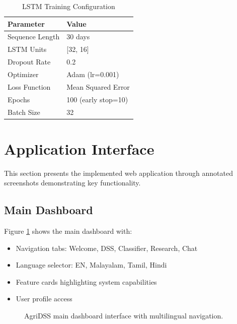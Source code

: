 \documentclass[journal,10pt,twoside]{IEEEtran}
\begin{document}
\begin{table}[h]
\centering
\caption{LSTM Training Configuration}
\begin{tabular}{|l|l|}
\hline
\textbf{Parameter} & \textbf{Value} \\
\hline
Sequence Length & 30 days \\
LSTM Units & [32, 16] \\
Dropout Rate & 0.2 \\
Optimizer & Adam (lr=0.001) \\
Loss Function & Mean Squared Error \\
Epochs & 100 (early stop=10) \\
Batch Size & 32 \\
\hline
\end{tabular}
\end{table}

\section{Application Interface}

This section presents the implemented web application through annotated screenshots demonstrating key functionality.

\subsection{Main Dashboard}

Figure \ref{fig:app_dashboard} shows the main dashboard with:
\begin{itemize}
    \item Navigation tabs: Welcome, DSS, Classifier, Research, Chat
    \item Language selector: EN, Malayalam, Tamil, Hindi
    \item Feature cards highlighting system capabilities
    \item User profile access
\end{itemize}

\begin{figure}[!t]
\centering
{}
\caption{AgriDSS main dashboard interface with multilingual navigation.}
\label{fig:app_dashboard}
\end{figure}
\end{document}
